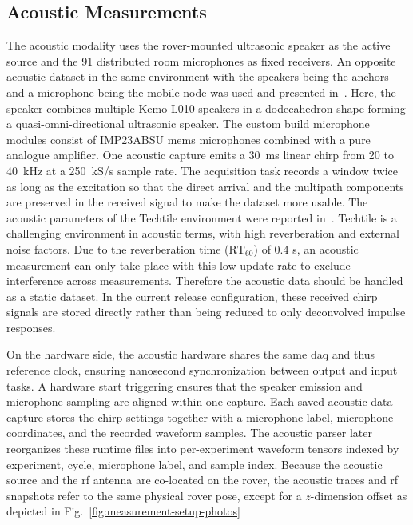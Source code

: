 \subsection{Acoustic Measurements}
The acoustic modality uses the rover-mounted ultrasonic speaker as the active source and the 91 distributed room microphones as fixed receivers. An opposite acoustic dataset in the same environment with the speakers being the anchors and a microphone being the mobile node was used and presented in~\cite{Echoes_of_accuracy, dataset_ultrasound_techtile}. Here, the speaker combines multiple Kemo L010 speakers in a dodecahedron shape forming a quasi-omni-directional ultrasonic speaker. The custom build microphone modules consist of IMP23ABSU \gls{mems} microphones combined with a pure analogue amplifier. One acoustic capture emits a 30~ms linear chirp from 20 to 40~kHz at a 250~kS/s sample rate. The acquisition task records a window twice as long as the excitation so that the direct arrival and the multipath components are preserved in the received signal to make the dataset more usable. The acoustic parameters of the Techtile environment were reported in~\cite{techtile-acoustic}. Techtile is a challenging environment in acoustic terms, with high reverberation and external noise factors. Due to the reverberation time ($\text{RT}_{60}$) of 0.4 s, an acoustic measurement can only take place with this low update rate to exclude interference across measurements. Therefore the acoustic data should be handled as a static dataset. In the current release configuration, these received chirp signals are stored directly rather than being reduced to only deconvolved impulse responses.

On the hardware side, the acoustic hardware shares the same \gls{daq} and thus reference clock, ensuring nanosecond synchronization between output and input tasks. A hardware start triggering ensures that the speaker emission and microphone sampling are aligned within one capture. Each saved acoustic data capture stores the chirp settings together with a microphone label, microphone coordinates, and the recorded waveform samples. The acoustic parser later reorganizes these runtime files into per-experiment waveform tensors indexed by experiment, cycle, microphone label, and sample index. Because the acoustic source and the \gls{rf} antenna are co-located on the rover, the acoustic traces and \gls{rf} snapshots refer to the same physical rover pose, except for a $z$-dimension offset as depicted in Fig.~\ref{fig:measurement-setup-photos} 

